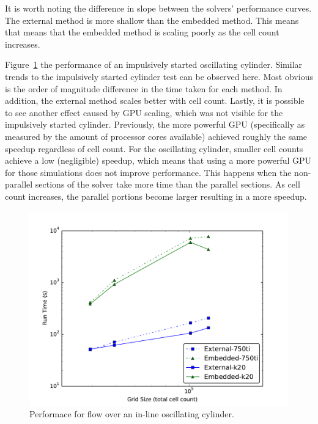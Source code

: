 It is worth noting the difference in slope between the solvers' performance curves. 
The external method is more shallow than the embedded method. 
This means that means that the embedded method is scaling poorly as the cell count increases. 

Figure~\ref{fig:oscperf} the performance of an impulsively started oscillating cylinder. 
Similar trends to the impulsively started cylinder test can be observed here.
Most obvious is the order of magnitude difference in the time taken for each method. 
In addition, the external method scales better with cell count. 
Lastly, it is possible to see another effect caused by GPU scaling, which was not visible for the impulsively started cylinder. 
Previously, the more powerful GPU (specifically as measured by the amount of processor cores available) achieved roughly the same speedup regardless of cell count. 
For the oscillating cylinder, smaller cell counts achieve a low (negligible) speedup, which means that using a more powerful GPU for those simulations does not improve performance. 
This happens when the non-parallel sections of the solver take more time than the parallel sections. 
As cell count increases, the parallel portions become larger resulting in a more speedup. 
\begin{figure}[!htb]
	\centering
	\par\medskip
	\includegraphics[width=0.6\linewidth]{osc_performance}
	\caption{Performace for flow over an in-line oscillating cylinder.}
	\label{fig:oscperf}
\end{figure}

